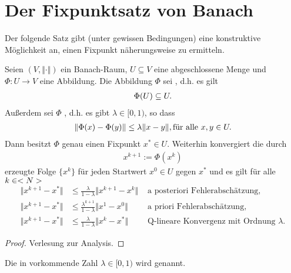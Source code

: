 \section{Der Fixpunktsatz von Banach}

Der folgende Satz gibt (unter gewissen Bedingungen) eine konstruktive Möglichkeit an, einen Fixpunkt näherungsweise zu ermitteln.

\begin{proposition}
	Seien $(V, \Vert \cdot \Vert)$ ein Banach-Raum, $U \subseteq V$ eine abgeschlossene Menge und $\Phi: U \to V$ eine Abbildung. Die Abbildung $\Phi$ sei , d.h. es gilt
	\begin{align}
	\Phi(U) \subseteq U.\notag
	\end{align}
	Außerdem sei $\Phi$ , d.h. es gibt $\lambda \in [0,1)$, so dass
	\begin{align}
	\Vert\Phi(x) - \Phi(y)\Vert \le \lambda \Vert x-y\Vert, \text{für alle } x,y \in U.\notag
	\end{align}
	Dann besitzt $\Phi$ genau einen Fixpunkt $x^{*} \in U$. Weiterhin konvergiert die durch
	\begin{align}
	x^{k+1} := \Phi(x^k) \label{eq_1_1_1}
	\end{align}
	erzeugte Folge $\{x^k\}$ für jeden Startwert $x^0 \in U$ gegen $x^{*}$ und es gilt für alle $k \in <N>$
	\begin{align}
	\Vert x^{k+1} - x^{*}\Vert &\le \frac{\lambda}{1 - \lambda}\Vert x^{k+1} - x^k\Vert &\text{ a posteriori Fehlerabschätzung}, \label{eq_1_2_2}\\
	\Vert x^{k+1} - x^{*}\Vert &\le \frac{\lambda^{k+1}}{1 - \lambda}\Vert x^1 - x^0\Vert &\text{ a priori Fehlerabschätzung},\label{eq_1_2_3_}\\
	\Vert x^{k+1} - x^{*}\Vert &\le \frac{\lambda}{1 - \lambda}\Vert x^{k} - x^{*}\Vert &\text{ Q-lineare Konvergenz mit Ordnung }\lambda. \label{eq_1_2_4}
	\end{align}
\end{proposition}

\begin{proof}
	Verlesung zur Analysis.
\end{proof}

Die in  vorkommende Zahl $\lambda \in [0,1)$ wird  genannt. 